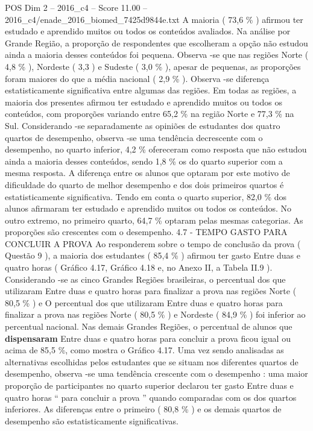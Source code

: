 \begin{textsample}{POS Dim 2 – 2016\_c4 – Score 11.00 – 2016\_c4/enade\_2016\_biomed\_7425d9844e.txt}
A maioria ( 73,6 \% ) afirmou ter estudado e aprendido muitos ou todos os conteúdos avaliados.
Na análise por Grande Região, a proporção de respondentes que escolheram a opção não estudou ainda a maioria desses conteúdos foi pequena.
Observa -se que nas regiões Norte ( 4,8 \% ), Nordeste ( 3,3 ) e Sudeste ( 3,0 \% ), apesar de pequenas, as proporções foram maiores do que a média nacional ( 2,9 \% ).
Observa -se diferença estatisticamente significativa entre algumas das regiões.
Em todas as regiões, a maioria dos presentes afirmou ter estudado e aprendido muitos ou todos os conteúdos, com proporções variando entre 65,2 \% na região Norte e 77,3 \% na Sul.
Considerando -se separadamente as opiniões de estudantes dos quatro quartos de desempenho, observa -se uma tendência decrescente com o desempenho, no quarto inferior, 4,2 \% ofereceram como resposta que não estudou ainda a maioria desses conteúdos, sendo 1,8 \% os do quarto superior com a mesma resposta.
A diferença entre os alunos que optaram por este motivo de dificuldade do quarto de melhor desempenho e dos dois primeiros quartos é estatisticamente significativa.
Tendo em conta o quarto superior, 82,0 \% dos alunos afirmaram ter estudado e aprendido muitos ou todos os conteúdos.
No outro extremo, no primeiro quarto, 64,7 \% optaram pelas mesmas categorias.
As proporções são crescentes com o desempenho. 4.7 - TEMPO GASTO PARA CONCLUIR A PROVA Ao responderem sobre o tempo de conclusão da prova ( Questão 9 ), a maioria dos estudantes ( 85,4 \% ) afirmou ter gasto Entre duas e quatro horas ( Gráfico 4.17, Gráfico 4.18 e, no Anexo II, a Tabela II.9 ).
Considerando -se as cinco Grandes Regiões brasileiras, o percentual dos que utilizaram Entre duas e quatro horas para finalizar a prova nas regiões Norte ( 80,5 \% ) e O percentual dos que utilizaram Entre duas e quatro horas para finalizar a prova nas regiões Norte ( 80,5 \% ) e Nordeste ( 84,9 \% ) foi inferior ao percentual nacional.
Nas demais Grandes Regiões, o percentual de alunos que \textbf{dispensaram} Entre duas e quatro horas para concluir a prova ficou igual ou acima de 85,5 \%, como mostra o Gráfico 4.17.
Uma vez sendo analisadas as alternativas escolhidas pelos estudantes que se situam nos diferentes quartos de desempenho, observa -se uma tendência crescente com o desempenho : uma maior proporção de participantes no quarto superior declarou ter gasto Entre duas e quatro horas “ para concluir a prova ” quando comparadas com os dos quartos inferiores.
As diferenças entre o primeiro ( 80,8 \% ) e os demais quartos de desempenho são estatisticamente significativas.

\end{textsample}
